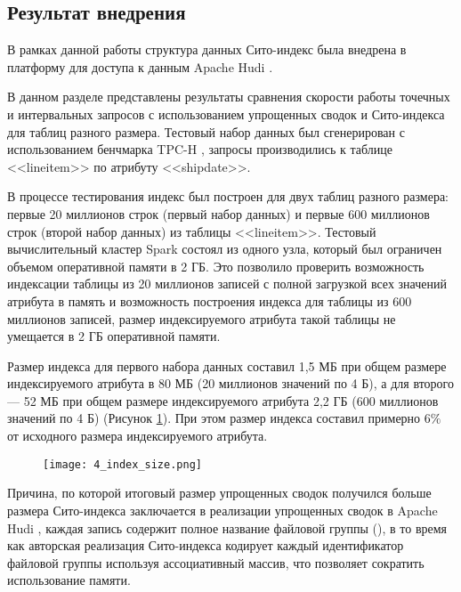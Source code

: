\subsection{Результат внедрения}
В рамках данной работы структура данных Сито-индекс была внедрена в платформу для доступа к данным Apache Hudi .

В данном разделе представлены результаты сравнения скорости работы точечных и интервальных запросов с использованием упрощенных сводок и Сито-индекса для таблиц разного размера. Тестовый набор данных был сгенерирован с использованием бенчмарка TPC-H , запросы производились к таблице {<<lineitem>>} по атрибуту {<<shipdate>>}.

В процессе тестирования индекс был построен для двух таблиц разного размера: первые 20 миллионов строк (первый набор данных) и первые 600 миллионов строк (второй набор данных) из таблицы {<<lineitem>>}. Тестовый вычислительный кластер Spark состоял из одного узла, который был ограничен объемом оперативной памяти в 2 ГБ. Это позволило проверить возможность индексации таблицы из 20 миллионов записей с полной загрузкой всех значений атрибута в память и возможность построения индекса для таблицы из 600 миллионов записей, размер индексируемого атрибута такой таблицы не умещается в 2 ГБ оперативной памяти.

Размер индекса для первого набора данных составил 1,5 МБ при общем размере индексируемого атрибута в 80 МБ (20 миллионов значений по 4 Б), а для второго — 52 МБ при общем размере индексируемого атрибута 2,2 ГБ (600 миллионов значений по 4 Б) (Рисунок \ref{figure:index_size}). При этом размер индекса составил примерно $6\%$ от исходного размера индексируемого атрибута.

\begin{figure}[h]
    \centering
    \texttt{[image: 4\_index\_size.png]}
    \caption{}
    \label{figure:index_size}
\end{figure}

Причина, по которой итоговый размер упрощенных сводок получился больше размера Сито-индекса заключается в реализации упрощенных сводок в Apache Hudi , каждая запись содержит полное название файловой группы (), в то время как авторская реализация Сито-индекса кодирует каждый идентификатор файловой группы используя ассоциативный массив, что позволяет сократить использование памяти. 

